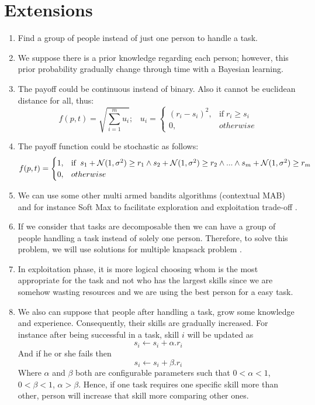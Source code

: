 \documentclass[]{article}
\begin{document}
\section{Extensions}\label{extension}
\begin{enumerate}
	\item Find a group of people instead of just one person to handle a task.
	\item We suppose there is a prior knowledge regarding each person; however, this prior probability gradually change through time with a Bayesian learning.
	\item The payoff could be continuous instead of binary. Also it cannot be euclidean distance for all, thus: 
	\begin{equation}
		f(p,t) = \sqrt{\sum_{i=1}^{m}u_i};\;\;\;
		u_i = 
		\begin{cases}
			(r_i - s_i)^2,	& \text{if}\; r_i \geq s_i\\
			0,	& otherwise
		\end{cases}
	\end{equation}
	\item The payoff function could be stochastic as follows:
	\begin{equation}
		f(p,t) = 
		\begin{cases}
			1,	& \text{if\;\;} s_1 + \mathcal{N}(1,\sigma^2) \geq r_1 \wedge s_2 + \mathcal{N}(1,\sigma^2) \geq r_2 \wedge ... \wedge s_m + \mathcal{N}(1,\sigma^2) \geq r_m\\
			0,	& otherwise
		\end{cases}
	\end{equation}
	\item We can use some other multi armed bandits algorithms (contextual MAB) and for instance Soft Max to facilitate exploration and exploitation trade-off \cite{li2010contextual, kuleshov2014algorithms}.
	\item If we consider that tasks are decomposable then we can have a group of people handling a task instead of solely one person. Therefore, to solve this problem, we will use solutions for multiple knapsack problem \cite{chekuri2005polynomial}.
	\item In exploitation phase, it is more logical choosing whom is the most appropriate for the task and not who has the largest skills since we are somehow wasting resources and we are using the best person for a easy task.
	\item We also can suppose that people after handling a task, grow some knowledge and experience. Consequently, their skills are gradually increased. For instance after being successful in a task, skill $i$ will be updated as
	\begin{equation}
		s_i \leftarrow s_i + \alpha.r_i
	\end{equation}
	And if he or she fails then
	\begin{equation}
		s_i \leftarrow s_i + \beta.r_i
	\end{equation}
	Where $\alpha$ and $\beta$ both are configurable parameters such that $0<\alpha<1$, $0<\beta<1$,  $\alpha>\beta$. Hence, if one task requires one specific skill more than other, person will increase that skill more comparing other ones.
	
\end{enumerate}



\end{document}
